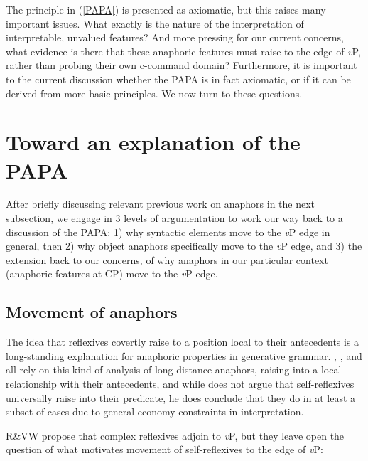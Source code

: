 \documentclass[output=paper
,modfonts
,nonflat
]{langsci/langscibook}
\begin{document}
The principle in (\ref{PAPA}) is presented as axiomatic, but this raises many important issues. What exactly is the nature of the interpretation of interpretable, unvalued features? And more pressing for our current concerns, what evidence is there that these anaphoric features must raise to the edge of \textit{v}P, rather than probing their own c-command domain? Furthermore, it is important to the current discussion whether the PAPA is in fact axiomatic, or if it can be derived from more basic principles. We now turn to these questions.

\section{Toward an explanation of the PAPA} \label{ExplainPAPA}

After briefly discussing relevant previous work on anaphors in the next subsection, we engage in 3 levels of argumentation to work our way back to a discussion of the PAPA: 1) why syntactic elements move to the \textit{v}P edge in general, then 2) why object anaphors specifically move to the \textit{v}P edge, and 3) the extension back to our concerns, of why anaphors in our particular context (anaphoric features at CP) move to the \textit{v}P edge. 

\subsection{Movement of anaphors}
The idea that reflexives covertly raise to a position local to their antecedents is a long-standing explanation for anaphoric properties in generative grammar. \citet{Safir:2004}, \citet{Pica:1987}, and \citet{Cole:1990} all rely on this kind of analysis of long-distance anaphors, raising into a local relationship with their antecedents, and while \citet{Reuland:2011} does not argue that self-reflexives universally raise into their predicate, he does conclude that they do in at least a subset of cases due to general economy constraints in interpretation. 

R\&VW propose that complex reflexives adjoin to \textit{v}P, but they leave open the question of what motivates movement of self-reflexives to the edge of \textit{v}P: 
\end{document}
